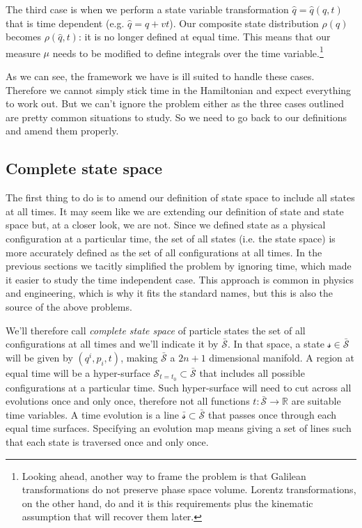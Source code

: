 \documentclass[smallextended]{svjour3}
\numberwithin{equation}{section}
\begin{document}
The third case is when we perform a state variable transformation $\hat{q}=\hat{q}(q,t)$ that is time dependent (e.g. $\hat{q}=q+vt$). Our composite state distribution $\rho(q)$ becomes $\rho(\hat{q},t)$: it is no longer defined at equal time. This means that our measure $\mu$ needs to be modified to define integrals over the time variable.\footnote{Looking ahead, another way to frame the problem is that Galilean transformations do not preserve phase space volume. Lorentz transformations, on the other hand, do\cite{Treumann} and it is this requirements plus the kinematic assumption that will recover them later.}

As we can see, the framework we have is ill suited to handle these cases. Therefore we cannot simply stick time in the Hamiltonian and expect everything to work out. But we can't ignore the problem either as the three cases outlined are pretty common situations to study. So we need to go back to our definitions and amend them properly.

\subsection{Complete state space}

The first thing to do is to amend our definition of state space to include all states at all times. It may seem like we are extending our definition of state and state space but, at a closer look, we are not. Since we defined state as a physical configuration at a particular time, the set of all states (i.e. the state space) is more accurately defined as the set of all configurations at all times. In the previous sections we tacitly simplified the problem by ignoring time, which made it easier to study the time independent case. This approach is common in physics and engineering, which is why it fits the standard names, but this is also the source of the above problems.

We'll therefore call \emph{complete state space} of particle states the set of all configurations at all times and we'll indicate it by $\bar{\mathcal{S}}$. In that space, a state $\mathcal{s} \in \bar{\mathcal{S}}$ will be given by $(q^i, p_i, t)$, making $\bar{\mathcal{S}}$ a $2n+1$ dimensional manifold. A region at equal time will be a hyper-surface $\mathcal{S}_{t=t_0} \subset \bar{\mathcal{S}}$ that includes all possible configurations at a particular time. Such hyper-surface will need to cut across all evolutions once and only once, therefore not all functions $t : \bar{\mathcal{S}} \rightarrow \mathbb{R}$ are suitable time variables. A time evolution is a line  $\bar{\mathcal{s}} \subset \bar{\mathcal{S}}$ that passes once through each equal time surfaces. Specifying an evolution map means giving a set of lines such that each state is traversed once and only once.
\end{document}

